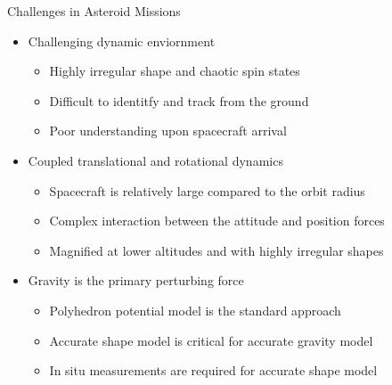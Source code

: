 \documentclass[11pt,professionalfonts,aspectratio=169]{beamer}
\begin{document}
\begin{frame}{Challenges in Asteroid Missions}
    \begin{itemize}
        \item<1->  Challenging dynamic enviornment
            \begin{itemize}
                \item<1-> Highly irregular shape and chaotic spin states
                \item<1-> Difficult to identitfy and track from the ground
                \item<1-> Poor understanding upon spacecraft arrival
            \end{itemize}
        \item<2-> Coupled translational and rotational dynamics
            \begin{itemize}
                \item Spacecraft is relatively large compared to the orbit radius
                \item Complex interaction between the attitude and position forces
                \item Magnified at lower altitudes and with highly irregular shapes
            \end{itemize}
        \item<3-> Gravity is the primary perturbing force
            \begin{itemize}
                \item Polyhedron potential model is the standard approach 
                \item Accurate shape model is critical for accurate gravity model
                \item In situ measurements are required for accurate shape model
            \end{itemize}
    \end{itemize}
   
\end{frame}
\end{document}
